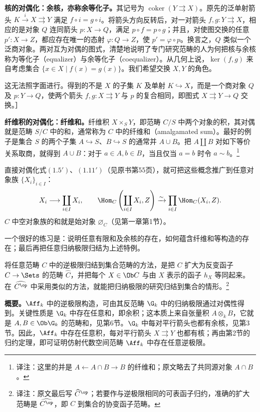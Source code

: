 \textbf{核的对偶化：余核，亦称余等化子。}其记号为 $\operatorname{coker}(Y\rightrightarrows X)$。原先的泛单射箭头 $K\xrightarrow i X\rightrightarrows Y$ 满足 $f\circ i=g\circ i$。将箭头方向反转后，对一对箭头 $f,g:Y\rightrightarrows X$，相应的是对象 $Q$ 连同箭头 $p:X\to Q$，满足 $p\circ f=p\circ g$；并且，对使图交换的任意 $p':X\to Z$，都应存在唯一的态射 $\varphi:Q\to Z$，使 $p'=\varphi\circ p$。换言之，$Q$ 类似一个泛商对象。两对互为对偶的图式，清楚地说明了专门研究范畴的人为何把核与余核称为等化子（equalizer）与余等化子（coequalizer）。从几何上说，$\ker(f,g)$ 来自考虑集合 $\{x\in X\mid f(x)=g(x)\}$。我们希望交换 $X,Y$ 的角色。

这无法照字面进行。得到的不是 $X$ 的子集 $K$ 及单射 $K\hookrightarrow X$，而是一个商对象 $Q$ 及 $p:Y\to Q$，使两个箭头 $f,g:X\rightrightarrows Y$ 与 $p$ 的复合相同，即图式 $X\rightrightarrows Y\to Q$ 交换。］

\textbf{纤维积的对偶化：纤维和。}纤维积 $X\times_S Y$，即范畴 $C/S$ 中两个对象的积，其对偶就是范畴 $S/C$ 中的和，通常称为 $C$ 中的纤维和（amalgamated sum）。最好的例子是集合 $S$ 的两个子集 $A\hookrightarrow S$、$B\hookrightarrow S$ 的通常并 $A\cup B$。把 $A\amalg B$ 对如下等价关系取商，就得到 $A\cup B$：对于 $a\in A,b\in B$，当且仅当 $a=b$ 时令 $a\sim b$。\footnote{译注：这里的并是 $A\leftarrow A\cap B\to B$ 的纤维和；原文略去了共同源对象 $A\cap B$。}

直接对偶化式$(1.5')$、$(1.11')$（见原书第55页），就可把这些概念推广到任意对象族 $\{X_i\}_{i\in I}$：
\[
 X_i\longrightarrow\coprod_{i\in I}X_i,\qquad
 \Hom_C\left(\coprod_{i\in I}X_i,Z\right)\xrightarrow\sim
 \prod_{i\in I}\Hom_C(X_i,Z).
\]
$C$ 中空对象族的和就是始对象 $\varnothing_C$（见第一章第1节）。

一个很好的练习是：说明任意有限和及余核的存在，如何蕴含纤维和等构造的存在；最后再把任意归纳极限归结为上述特例。

将任意范畴 $C$ 中的逆极限归结到集合范畴的方法，是把 $C$ 扩大为反变函子 $C\to\Sets$ 的范畴 $\widehat C$，并把每个 $X\in\Ob C$ 与由 $X$ 表示的函子 $h_X$ 等同起来。在 $\widehat{C^{\op}}$ 中采用类似的方法，就能把归纳极限的研究归结到集合的情形。\footnote{译注：原文最后写 $\widehat C^{\op}$；若要作与逆极限相同的可表函子归约，准确的扩大范畴是 $\widehat{C^{\op}}$，即 $C$ 到集合的协变函子范畴。}

\textbf{概要。}$\Aff_k$ 中的逆极限构造，可由其反范畴 $\G_k$ 中的归纳极限通过对偶性得到。关键性质是 $\G_k$ 中存在任意和，即余积；这本质上来自张量积 $A\otimes_kB$，它就是 $A,B\in\Ob\G_k$ 的范畴和，见第6节。$\G_k$ 中每对平行箭头也都有余核，见第3节。因此，$\Aff_k$ 中存在任意积，每对平行箭头 $X\rightrightarrows Y$ 也都有核；再由第2节的归约定理，即可证明仿射代数空间范畴 $\Aff_k$ 中存在任意逆极限。

